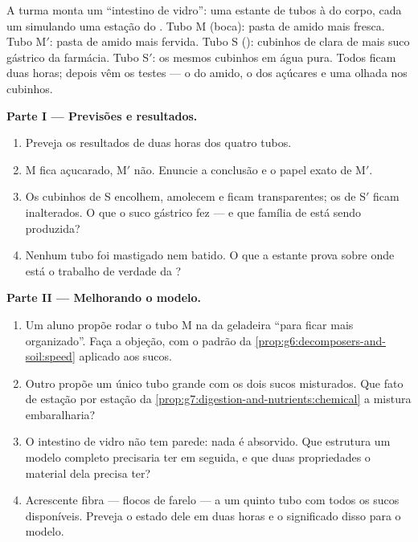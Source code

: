 \begin{problem}\label{pb:g7:digestion-and-nutrients:1}
A turma monta um ``intestino de vidro'': uma estante de tubos à
 do corpo, cada um simulando uma estação do .
Tubo M (boca): pasta de amido mais  fresca. Tubo M$'$: pasta de
amido mais  fervida. Tubo S (): cubinhos de clara de 
mais suco gástrico da farmácia. Tubo S$'$: os mesmos cubinhos em água
pura. Todos ficam duas horas; depois vêm os testes --- o do amido, o
dos açúcares e uma olhada nos cubinhos.

\medskip\noindent\textbf{Parte I --- Previsões e
resultados.}
\begin{enumerate}
  \item Preveja os resultados de duas horas dos quatro tubos.
  \item M fica açucarado, M$'$ não. Enuncie a conclusão e o papel
        exato de M$'$.
  \item Os cubinhos de S encolhem, amolecem e ficam transparentes; os
        de S$'$ ficam inalterados. O que o suco gástrico fez --- e que
        família de  está sendo produzida?
  \item Nenhum tubo foi mastigado nem batido. O que a estante prova
        sobre onde está o trabalho de verdade da ?
\end{enumerate}

\medskip\noindent\textbf{Parte II --- Melhorando o modelo.}
\begin{enumerate}[resume]
  \item Um aluno propõe rodar o tubo M na  da geladeira
        ``para ficar mais organizado''. Faça a objeção, com o padrão
        da \cref{prop:g6:decomposers-and-soil:speed} aplicado aos
        sucos.
  \item Outro propõe um único tubo grande com os dois sucos
        misturados. Que fato de estação por estação da
        \cref{prop:g7:digestion-and-nutrients:chemical} a mistura
        embaralharia?
  \item O intestino de vidro não tem parede: nada é absorvido. Que
        estrutura um modelo completo precisaria ter em seguida, e que
        duas propriedades o material dela precisa ter?
  \item Acrescente fibra --- flocos de farelo --- a um quinto tubo com
        todos os sucos disponíveis. Preveja o estado dele em duas
        horas e o significado disso para o modelo.
\end{enumerate}


\end{problem}
